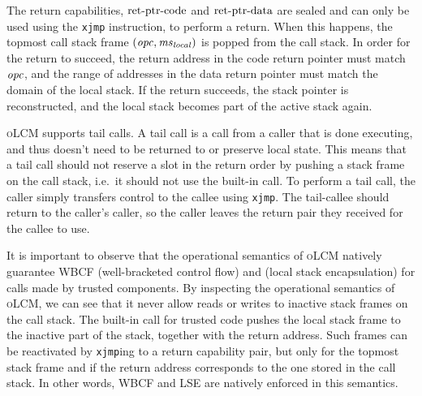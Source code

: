 \documentclass[acmsmall,screen]{acmart}\settopmatter{}
\newcommand{\srccm}{\textsc{oLCM}}
\begin{document}
The return capabilities, $\mathrm{ret\text{-}ptr\text{-}code}$ and $\mathrm{ret\text{-}ptr\text{-}data}$ are sealed and can only be used using the \texttt{xjmp} instruction, to perform a return.
When this happens, the topmost call stack frame $(\mathit{opc},\mathit{ms}_{\mathit{local}})$ is popped from the call stack.
In order for the return to succeed, the return address in the code return pointer must match $\mathit{opc}$, and the range of addresses in the data return pointer must match the domain of the local stack.
If the return succeeds, the stack pointer is reconstructed, and the local stack becomes part of the active stack again.

\srccm{} supports tail calls.
A tail call is a call from a caller that is done executing, and thus doesn't need to be returned to or preserve local state.
This means that a tail call should not reserve a slot in the return order by pushing a stack frame on the call stack, i.e.\ it should not use the built-in call.
To perform a tail call, the caller simply transfers control to the callee using \texttt{xjmp}.
The tail-callee should return to the caller's caller, so the caller leaves the return pair they received for the callee to use.

It is important to observe that the operational semantics of \srccm{} natively guarantee WBCF (well-bracketed control flow) and (local stack encapsulation) for calls made by trusted components.
By inspecting the operational semantics of \srccm{}, we can see that it never allow reads or writes to inactive stack frames on the call stack.
The built-in call for trusted code pushes the local stack frame to the inactive part of the stack, together with the return address. 
Such frames can be reactivated by \texttt{xjmp}ing to a return capability pair, but only for the topmost stack frame and if the return address corresponds to the one stored in the call stack.
In other words, WBCF and LSE are natively enforced in this semantics.
\end{document}

